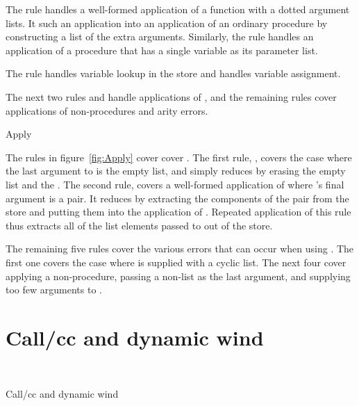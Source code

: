 The rule  handles a well-formed application of a function with a dotted argument lists. 
It such an application into an application of an
ordinary procedure by constructing a list of the extra arguments. Similarly, the rule  handles an application of a procedure that has a single variable as its parameter list.

The rule  handles variable lookup in the store and  handles variable assignment.

The next two rules  and  handle applications of , and the remaining rules cover applications of non-procedures and arity errors.

\beginfig
\subfigureadjust{}
\begin{center}


\end{center}
\caption{Apply}\label{fig:Apply}
\endfig
\subfigurestop{}

The rules in figure~\ref{fig:Apply} cover 
cover . 
The first rule, , covers the case where the last argument to
 is the empty list, and simply reduces by erasing the
empty list and the . The second rule, 
covers a well-formed application of  where 's final argument is a pair. It
reduces by extracting the components of the pair from the store and
putting them into the application of . Repeated
application of this rule thus extracts all of the list elements passed
to  out of the store. 

The remaining five rules cover the
various errors that can occur when using . The first one covers the case where  is supplied with a cyclic list. The next four cover applying a
non-procedure, passing a non-list as the last argument, and supplying
too few arguments to .

\section{Call/cc and dynamic wind}

\beginfig
\begin{center}
 \\

\end{center}
\caption{Call/cc and dynamic wind}\label{fig:Call-cc--and--dynamic-wind}
\endfig

